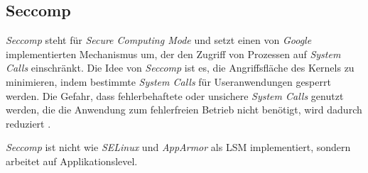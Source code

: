 \documentclass[../main.tex]{subfiles}
\begin{document}




    \subsection{Seccomp}
		\label{seccomp}


			\emph{Seccomp} steht für \emph{Secure Computing Mode} und setzt einen von \emph{Google} implementierten Mechanismus um, der den Zugriff von Prozessen auf \emph{System Calls} einschränkt. Die Idee von \emph{Seccomp} ist es, die Angriffsfläche des Kernels zu minimieren, indem bestimmte \emph{System Calls} für Useranwendungen gesperrt werden. Die Gefahr, dass fehlerbehaftete oder unsichere \emph{System Calls} genutzt werden, die die Anwendung zum fehlerfreien Betrieb nicht benötigt, wird dadurch reduziert \cite{linuxSecOverview}\cite{seccompGitDesc}\cite{secInFuture}.

			\emph{Seccomp} ist nicht wie \emph{SELinux} und \emph{AppArmor} als LSM implementiert, sondern arbeitet auf Applikationslevel.
\end{document}
